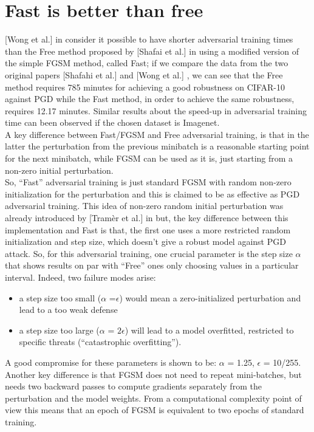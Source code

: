 \documentclass{article}
\begin{document}
\section{Fast is better than free}

[Wong et al.] in \cite{WongEtAl2020} consider it possible to have shorter adversarial training times than the Free method proposed by [Shafai et al.] in \cite{ShafahiEtAl2019b} using a modified version of the simple FGSM method, called Fast; if we compare the data from the two original papers [Shafahi et al.] \cite{ShafahiEtAl2019b} and [Wong et al.] \cite{WongEtAl2020}, we can see that the Free method requires 785 minutes for achieving a good robustness on CIFAR-10 against PGD while the Fast method, in order to achieve the same robustness, requires 12.17 minutes. Similar results about the speed-up in adversarial training time can been observed if the chosen dataset is Imagenet.\\
A key difference between Fast/FGSM and Free adversarial training, is that in the latter the perturbation from the previous minibatch is a reasonable starting point for the next minibatch, while FGSM can be used as it is, just starting from a non-zero initial perturbation.\\
So, “Fast” adversarial training is just standard FGSM with random non-zero initialization for the perturbation and this is claimed to be as effective as PGD adversarial training. This idea of non-zero random initial perturbation was already introduced by [Tramèr et al.] in \cite{TramerEtAl2017} but, the key difference between this implementation and Fast is that, the first one uses a more restricted random initialization and step size, which doesn't give a robust model against PGD attack.  So, for this adversarial training, one crucial parameter is the step size $\alpha$ that shows results on par with “Free” ones only choosing values in a particular interval. Indeed, two failure modes arise:

\begin{itemize}

\item a step size too small ($\alpha$ =$\epsilon$) would mean a zero-initialized perturbation and lead to a too weak defense
\item a step size too large ($\alpha$ = $2\epsilon$) will lead to a model overfitted, restricted to specific threats (“catastrophic overfitting”).
\end{itemize}

A good compromise for these parameters is shown to be: $\alpha$ = 1.25, $\epsilon$ = 10/255.\\
Another key difference is that FGSM does not need to repeat mini-batches, but needs two backward passes to compute gradients separately from the perturbation and the model weights. From a computational complexity point of view this means that an epoch of FGSM is equivalent to two epochs of standard training.
\end{document}
